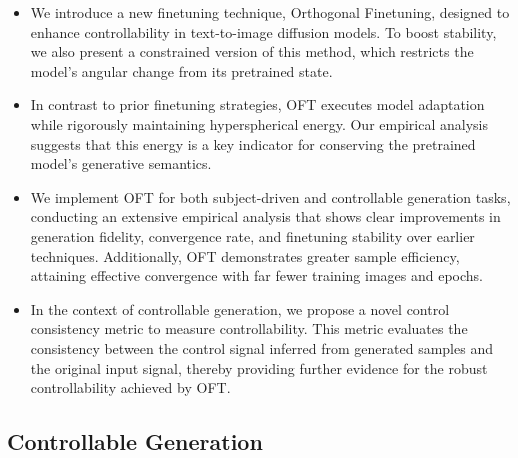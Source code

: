 \begin{itemize}[leftmargin=*,nosep]
Although classical methods such as the Gram-Schmidt process can maintain differentiability, they are computationally demanding and impractical for large-scale use~\cite{liu2021orthogonal}. For improved computational efficiency, we utilize the Cayley parameterization, which produces an orthogonal matrix as follows: $\thickmuskip=2mu \medmuskip=2mu \bm{R} = (\bm{I} + \bm{Q})(I - \bm{Q})^{-1}$, where $\bm{Q}$ is a skew-symmetric matrix, i.e., $\thickmuskip=2mu \medmuskip=2mu \bm{Q} = -\bm{Q}^\top$. This approach, while more efficient, imposes a mild constraint: the Cayley parameterization yields only special orthogonal matrices, i.e., with determinant 1. Empirically, we observe this constraint does not impact overall performance. Nevertheless, directly applying Cayley transforms to parameterize $\bm{R}$ remains parameter-intensive, especially for large values of $d$. To mitigate this, we decompose $\bm{R}$ into a block-diagonal matrix containing $r$ blocks, resulting in the structure:

    \item We introduce a new finetuning technique, Orthogonal Finetuning, designed to enhance controllability in text-to-image diffusion models. To boost stability, we also present a constrained version of this method, which restricts the model’s angular change from its pretrained state.
    \item In contrast to prior finetuning strategies, OFT executes model adaptation while rigorously maintaining hyperspherical energy. Our empirical analysis suggests that this energy is a key indicator for conserving the pretrained model’s generative semantics.
    \item We implement OFT for both subject-driven and controllable generation tasks, conducting an extensive empirical analysis that shows clear improvements in generation fidelity, convergence rate, and finetuning stability over earlier techniques. Additionally, OFT demonstrates greater sample efficiency, attaining effective convergence with far fewer training images and epochs.
    \item In the context of controllable generation, we propose a novel control consistency metric to measure controllability. This metric evaluates the consistency between the control signal inferred from generated samples and the original input signal, thereby providing further evidence for the robust controllability achieved by OFT.
\end{itemize}

\subsection{Controllable Generation}

